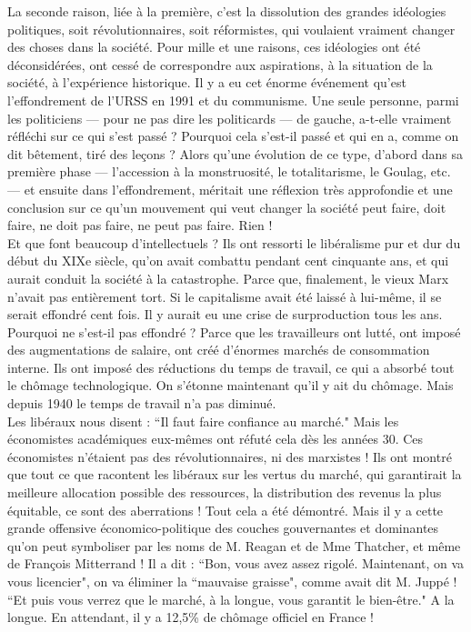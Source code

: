 La seconde raison, liée à la première, c’est la dissolution des grandes idéologies politiques, soit révolutionnaires, soit réformistes, qui voulaient vraiment changer des choses dans la société. Pour mille et une raisons, ces idéologies ont été déconsidérées, ont cessé de correspondre aux aspirations, à la situation de la société, à l’expérience historique. Il y a eu cet énorme événement qu’est l’effondrement de l’URSS en 1991 et du communisme. Une seule personne, parmi les politiciens --- pour ne pas dire les politicards --- de gauche, a-t-elle vraiment réfléchi sur ce qui s’est passé ? Pourquoi cela s’est-il passé et qui en a, comme on dit bêtement, tiré des leçons ? Alors qu’une évolution de ce type, d’abord dans sa première phase --- l’accession à la monstruosité, le totalitarisme, le Goulag, etc. --- et ensuite dans l’effondrement, méritait une réflexion très approfondie et une conclusion sur ce qu’un mouvement qui veut changer la société peut faire, doit faire, ne doit pas faire, ne peut pas faire. Rien !\\
Et que font beaucoup d’intellectuels ? Ils ont ressorti le libéralisme pur et dur du début du XIXe siècle, qu’on avait combattu pendant cent cinquante ans, et qui aurait conduit la société à la catastrophe. Parce que, finalement, le vieux Marx n’avait pas entièrement tort. Si le capitalisme avait été laissé à lui-même, il se serait effondré cent fois. Il y aurait eu une crise de surproduction tous les ans. Pourquoi ne s’est-il pas effondré ? Parce que les travailleurs ont lutté, ont imposé des augmentations de salaire, ont créé d’énormes marchés de consommation interne. Ils ont imposé des réductions du temps de travail, ce qui a absorbé tout le chômage technologique. On s’étonne maintenant qu’il y ait du chômage. Mais depuis 1940 le temps de travail n’a pas diminué.\\
Les libéraux nous disent : ``Il faut faire confiance au marché." Mais les économistes académiques eux-mêmes ont réfuté cela dès les années 30. Ces économistes n’étaient pas des révolutionnaires, ni des marxistes ! Ils ont montré que tout ce que racontent les libéraux sur les vertus du marché, qui garantirait la meilleure allocation possible des ressources, la distribution des revenus la plus équitable, ce sont des aberrations ! Tout cela a été démontré. Mais il y a cette grande offensive économico-politique des couches gouvernantes et dominantes qu’on peut symboliser par les noms de M. Reagan et de Mme Thatcher, et même de François Mitterrand ! Il a dit : ``Bon, vous avez assez rigolé. Maintenant, on va vous licencier", on va éliminer la ``mauvaise graisse", comme avait dit M. Juppé ! ``Et puis vous verrez que le marché, à la longue, vous garantit le bien-être." A la longue. En attendant, il y a 12,5\% de chômage officiel en France !


